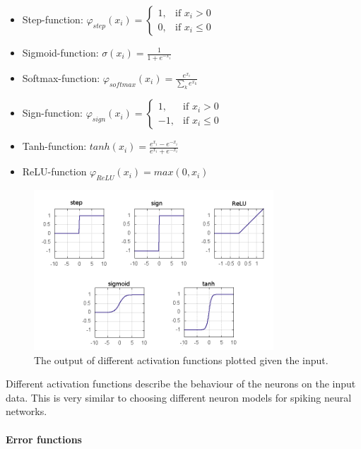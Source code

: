\begin{itemize}
	\item Step-function: $\varphi_{step}(x_i) = \begin{cases} 1, & \text{if  } x_i > 0 \\ 0, & \text{if  } x_i \le 0  \end{cases}$
	\item Sigmoid-function: $\sigma(x_i) = \frac{1}{1 + e^{-x_i}}$ 
	\item Softmax-function: $\varphi_{softmax}(x_i) = \frac{e^{x_i}}{\sum_k e^{x_k}}$ 
	\item Sign-function: $\varphi_{sign}(x_i) = \begin{cases} 1, & \text{if  } x_i > 0 \\ -1, & \text{if  } x_i \le 0  \end{cases}$
	\item Tanh-function: $tanh(x_i) = \frac{e^{x_i} - e^{-x_i}}{e^{x_i} + e^{-x_i}}$
	\item ReLU-function $\varphi_{ReLU}(x_i) = max(0, x_i)$
\end{itemize}

\begin{figure}
	\centering
    	\includegraphics[width=0.8\textwidth]{imgs/act_fun.png} 
    \caption{The output of different activation functions plotted given the input.}
	\label{fig:activations}
\end{figure}

Different activation functions describe the behaviour of the neurons on the input data. This is very similar to choosing different neuron models for spiking neural networks.


\paragraph{Error functions}

